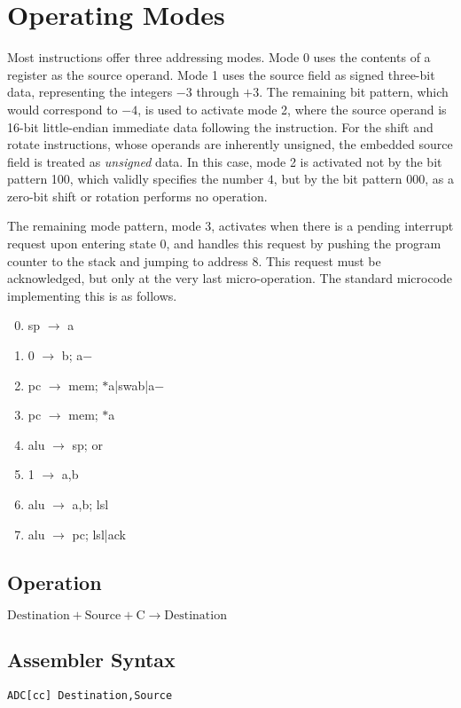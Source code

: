 \documentclass[11pt]{book}
\newcommand*{\instruction}[2][]{%
  \clearpage
  \thispagestyle{fancy}%
  \fancyhf[HL,HR]{\huge{#2}}%
  \fancyhf[HC]{#1}\addtocounter{section}{1}\noindent
}
\begin{document}
\section{Operating Modes}
Most instructions offer three addressing modes.
Mode 0 uses the contents of a register as the source operand.
Mode 1 uses the source field as signed three-bit data,
representing the integers \(-3\) through \(+3\).
The remaining bit pattern, which would correspond to \(-4\),
is used to activate mode 2,
where the source operand is 16-bit little-endian immediate data
following the instruction.
For the shift and rotate instructions,
whose operands are inherently unsigned,
the embedded source field is treated as \emph{unsigned} data.
In this case, mode 2 is activated not by the bit pattern 100,
which validly specifies the number \(4\),
but by the bit pattern 000,
as a zero-bit shift or rotation performs no operation.

The remaining mode pattern, mode 3,
activates when there is a pending interrupt request
upon entering state 0,
and handles this request
by pushing the program counter to the stack
and jumping to address 8.
This request must be acknowledged,
but only at the very last micro-operation.
The standard microcode implementing this is as follows.

{\ttfamily\selectfont\small
  \begin{enumerate}\setcounter{enumi}{-1}
  \item sp \(\rightarrow\) a
  \item 0 \(\rightarrow\) b; a\(-\)
  \item pc \(\rightarrow\) mem; \(\ast\)a|swab|a\(-\)
  \item pc \(\rightarrow\) mem; \(\ast\)a
  \item alu \(\rightarrow\) sp; or
  \item 1 \(\rightarrow\) a,b
  \item alu \(\rightarrow\) a,b; lsl
  \item alu \(\rightarrow\) pc; lsl|ack
  \end{enumerate}
}


\instruction[Add With Carry]{ADC}
\subsection*{Operation}
\(\text{Destination}+\text{Source}+\text{C}
\rightarrow\text{Destination}\)

\subsection*{Assembler Syntax}
\texttt{ADC[cc] Destination,Source}
\end{document}

